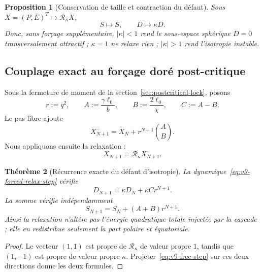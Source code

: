 \documentclass[11pt,a4paper]{article}
\newtheorem{theorem}{Théorème}[section]
\newtheorem{proposition}[theorem]{Proposition}
\begin{document}
\begin{proposition}[Conservation de taille et contraction du défaut]\label{prop:v9-size-defect}
Sous $X=(P,E)^T\mapsto\mathcal R_\kappa X$,
\begin{equation}\label{eq:v9-SD-relax}
 S\mapsto S,
 \qquad
 D\mapsto\kappa D.
\end{equation}
Donc, sans forçage supplémentaire, $|\kappa|<1$ rend le sous-espace sphérique $D=0$ transversalement attractif ; $\kappa=1$ ne relaxe rien ; $|\kappa|>1$ rend l'isotropie instable.
\end{proposition}

\subsection{Couplage exact au forçage doré post-critique}

Sous la fermeture de moment de la section~\ref{sec:postcritical-lock}, posons
\begin{equation}\label{eq:v9-rAB}
 r:=q^2,
 \qquad
 A:=\frac{\gamma\ell_0}{b},
 \qquad
 B:=\frac{2\ell_0}{\chi},
 \qquad
 C:=A-B.
\end{equation}
Le pas libre ajoute
\begin{equation}\label{eq:v9-free-step}
 X_{N+1}^{-}
 =X_N+r^{N+1}\binom{A}{B}.
\end{equation}
Nous appliquons ensuite la relaxation :
\begin{equation}\label{eq:v9-forced-relax-step}
 \boxed{X_{N+1}=\mathcal R_\kappa X_{N+1}^{-}.}
\end{equation}

\begin{theorem}[Récurrence exacte du défaut d'isotropie]\label{thm:v9-defect-recurrence}
La dynamique~\eqref{eq:v9-forced-relax-step} vérifie
\begin{equation}\label{eq:v9-D-recurrence}
 \boxed{D_{N+1}=\kappa D_N+\kappa C r^{N+1}.}
\end{equation}
La somme vérifie indépendamment
\begin{equation}\label{eq:v9-S-recurrence}
 S_{N+1}=S_N+(A+B)r^{N+1}.
\end{equation}
Ainsi la relaxation n'altère pas l'énergie quadratique totale injectée par la cascade ; elle en redistribue seulement la part polaire et équatoriale.
\end{theorem}

\begin{proof}
Le vecteur $(1,1)$ est propre de $\mathcal R_\kappa$ de valeur propre $1$, tandis que $(1,-1)$ est propre de valeur propre $\kappa$. Projeter~\eqref{eq:v9-free-step} sur ces deux directions donne les deux formules.
\end{proof}
\end{document}
